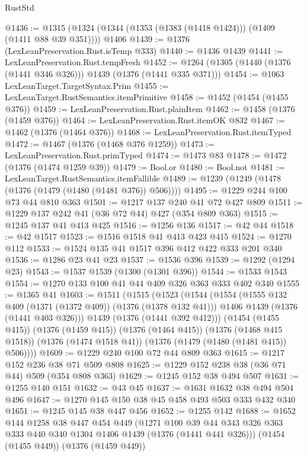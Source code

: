 \begin{lexlean}{RustStd}
\begin{coremodule}
@1436 := @1315 (@1324 (@1344 (@1353 (@1383 (@1418 @1424))) (@1409 (@1411 @88 @39 @351)))) @1406
@1439 := @1376 (LexLeanPreservation.Rust.isTemp @333)
@1440 := @1436 @1439
@1441 := LexLeanPreservation.Rust.tempFresh
@1452 := @1264 (@1305 (@1440 (@1376 (@1441 @346 @326))) @1439 (@1376 (@1441 @335 @371)))
@1454 := @1063 LexLeanTarget.TargetSyntax.Prim
@1455 := LexLeanTarget.RustSemantics.itemPrimitive
@1458 := @1452 (@1454 (@1455 @376))
@1459 := LexLeanPreservation.Rust.plainItem
@1462 := @1458 (@1376 (@1459 @376))
@1464 := LexLeanPreservation.Rust.itemOK @832
@1467 := @1462 (@1376 (@1464 @376))
@1468 := LexLeanPreservation.Rust.itemTyped
@1472 := @1467 (@1376 (@1468 @376 @1259))
@1473 := LexLeanPreservation.Rust.primTyped
@1474 := @1473 @83
@1478 := @1472 (@1376 (@1474 @1259 @39))
@1479 := Bool.or
@1480 := Bool.not
@1481 := LexLeanTarget.RustSemantics.itemFallible
@1489 := @1239 (@1249 (@1478 (@1376 (@1479 (@1480 (@1481 @376)) @506))))
@1495 := @1229 @244 @100 @73 @44 @810 @363
@1501 := @1217 @137 @240 @41 @72 @427 @809
@1511 := @1229 @137 @242 @41 (@36 @72 @44) @427 (@354 @809 @363)
@1515 := @1245 @137 @41 @413 @425
@1516 := @1256 @136
@1517 := @42 @44
@1518 := @42 @1517
@1523 := @1516 @1518 @41 @413 @423 @415
@1524 := @1270 @112
@1533 := @1524 @135 @41 @1517 @396 @412 @422 @333 @201 @340
@1536 := @1286 @23 @41 @23
@1537 := @1536 @396
@1539 := @1292 (@1294 @23)
@1543 := @1537 @1539 (@1300 (@1301 @396))
@1544 := @1533 @1543
@1554 := @1270 @133 @100 @41 @44 @409 @326 @363 @333 @402 @340
@1555 := @1365 @41
@1603 := @1511
    (@1515
      (@1523
        (@1544
          (@1554
            (@1555 @132 @409 (@1371 (@1372 @409)) (@1376 (@1378 @132 @41)))
            @1406
            @1439
            (@1376 (@1441 @403 @326)))
          @1439
          (@1376 (@1441 @392 @412)))
        (@1454 (@1455 @415))
        (@1376 (@1459 @415))
        (@1376 (@1464 @415))
        (@1376 (@1468 @415 @1518))
        (@1376 (@1474 @1518 @41))
        (@1376 (@1479 (@1480 (@1481 @415)) @506))))
@1609 := @1229 @240 @100 @72 @44 @809 @363
@1615 := @1217 @152 @236 @38 @71 @509 @808
@1625 := @1229 @152 @238 @38 (@36 @71 @44) @509 (@354 @808 @363)
@1629 := @1245 @152 @38 @494 @507
@1631 := @1255 @140 @151
@1632 := @43 @45
@1637 := @1631 @1632 @38 @494 @504 @496
@1647 := @1270 @145 @150 @38 @45 @458 @493 @503 @333 @432 @340
@1651 := @1245 @145 @38 @447 @456
@1652 := @1255 @142
@1688 := @1652
    @144
    @1258
    @38
    @447
    @454
    @449
    (@1271 @100 @39 @44 @343 @326 @363 @333 @440 @340 @1304 @1406 @1439 (@1376 (@1441 @441 @326)))
    (@1454 (@1455 @449))
    (@1376 (@1459 @449))

\end{coremodule}
\end{lexlean}
